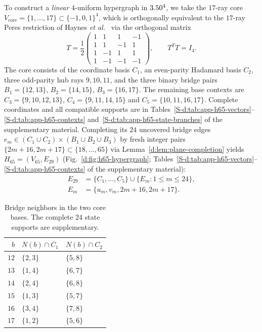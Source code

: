 \documentclass[aps,pra,reprint,superscriptaddress,longbibliography,nofootinbib,floatfix,10pt]{revtex4-2}
\theoremstyle{definition}\newtheorem{definition}[theorem]{Definition}
\theoremstyle{remark}\newtheorem{remark}[theorem]{Remark}
\begin{document}
To construct a \emph{linear} $4$-uniform hypergraph in $3.50^4$, we take the $17$-ray core $V_{\mathrm{core}}=\{1,\ldots,17\}\subset\{-1,0,1\}^4$, which is orthogonally equivalent to the $17$-ray Peres restriction of Haynes \emph{et al.}~\cite[pp.~8--9]{haynes2010orthogonal} via the orthogonal matrix
\begin{equation}\label{d:eq:haynes-transform}
T=\frac12\begin{pmatrix}
1&1&1&-1\\1&1&-1&1\\1&-1&1&1\\1&-1&-1&-1
\end{pmatrix},\qquad T^TT=I_4.
\end{equation}
The core consists of the coordinate basis $C_1$, an even-parity Hadamard basis $C_2$, three odd-parity hub rays $9,10,11$, and the three binary bridge pairs $B_1=\{12,13\}$, $B_2=\{14,15\}$, $B_3=\{16,17\}$. The remaining base contexts are $C_3=\{9,10,12,13\}$, $C_4=\{9,11,14,15\}$ and $C_5=\{10,11,16,17\}$. Complete coordinates and all compatible supports are in Tables~\ref{S-d:tab:app-h65-vectors}--\ref{S-d:tab:app-h65-contexts} and~\ref{S-d:tab:app-h65-state-branches} of the supplementary material. Completing its $24$ uncovered bridge edges $e_m\in(C_1\cup C_2)\times(B_1\cup B_2\cup B_3)$ by fresh integer pairs $\{2m+16,2m+17\}\subset\{18,\ldots,65\}$ via Lemma~\ref{d:lem:plane-completion} yields $H_{65}=(V_{65},E_{29})$ (Fig.~\ref{d:fig:h65-hypergraph}; Tables~\ref{S-d:tab:app-h65-vectors}--\ref{S-d:tab:app-h65-contexts} of the supplementary material):
\begin{equation}\label{d:eq:h65-contexts}
\begin{aligned}
E_{29}&=\{C_1,\ldots,C_5\}\cup\{E_m:1\le m\le24\},\\
E_m&=\{u_m,v_m,2m+16,2m+17\}.
\end{aligned}
\end{equation}

\begin{table}[t]
\centering\small\setlength{\tabcolsep}{3pt}
\caption{Bridge neighbors in the two core bases. The complete 24 state supports are supplementary.}\label{d:tab:bridge-neighbors}
\begin{tabular}{rp{}p{}}\toprule
$b$ & $N(b)\cap C_1$ & $N(b)\cap C_2$\\\midrule
$12$ & $\{2,3\}$ & $\{5,8\}$\\
$13$ & $\{1,4\}$ & $\{6,7\}$\\
$14$ & $\{2,4\}$ & $\{6,8\}$\\
$15$ & $\{1,3\}$ & $\{5,7\}$\\
$16$ & $\{3,4\}$ & $\{7,8\}$\\
$17$ & $\{1,2\}$ & $\{5,6\}$\\
\bottomrule\end{tabular}
\end{table}
\end{document}
